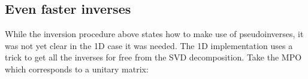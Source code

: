 \subsection{Even faster inverses}



While the inversion procedure above states how to make use of pseudoinverses, it was not yet clear in the 1D case it was needed. The 1D implementation uses a trick to get all the inverses for free from the \Gls{SVD} decomposition. Take the \Gls{MPO} which corresponds to a unitary matrix:




